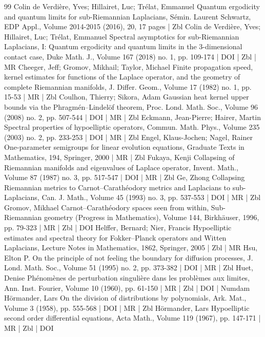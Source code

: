 \documentclass[10pt]{amsart}
\theoremstyle{definition}\newtheorem{defi}[theo]{Definition}\newtheorem{rema}[theo]{Remark}\newtheorem{exam}[theo]{Example}\newtheorem{exem}[theo]{Example}\newtheorem{nota}[theo]{Notation}
\begin{document}
\begin{thebibliography}{99}
Colin de Verdière, Yves; Hillairet, Luc; Trélat, Emmanuel Quantum ergodicity and quantum limits for sub-Riemannian Laplacians, Sémin. Laurent Schwartz, EDP Appl., Volume 2014-2015 (2016), 20, 17 pages | Zbl
Colin de Verdière, Yves; Hillairet, Luc; Trélat, Emmanuel Spectral asymptotics for sub-Riemannian Laplacians, I: Quantum ergodicity and quantum limits in the 3-dimensional contact case, Duke Math. J., Volume 167 (2018) no. 1, pp. 109-174 | DOI | Zbl | MR
Cheeger, Jeff; Gromov, Mikhail; Taylor, Michael Finite propagation speed, kernel estimates for functions of the Laplace operator, and the geometry of complete Riemannian manifolds, J. Differ. Geom., Volume 17 (1982) no. 1, pp. 15-53 | MR | Zbl
Coulhon, Thierry; Sikora, Adam Gaussian heat kernel upper bounds via the Phragmén–Lindelöf theorem, Proc. Lond. Math. Soc., Volume 96 (2008) no. 2, pp. 507-544 | DOI | MR | Zbl
Eckmann, Jean-Pierre; Hairer, Martin Spectral properties of hypoelliptic operators, Commun. Math. Phys., Volume 235 (2003) no. 2, pp. 233-253 | DOI | MR | Zbl
Engel, Klaus-Jochen; Nagel, Rainer One-parameter semigroups for linear evolution equations, Graduate Texts in Mathematics, 194, Springer, 2000 | MR | Zbl
Fukaya, Kenji Collapsing of Riemannian manifolds and eigenvalues of Laplace operator, Invent. Math., Volume 87 (1987) no. 3, pp. 517-547 | DOI | MR | Zbl
Ge, Zhong Collapsing Riemannian metrics to Carnot–Carathéodory metrics and Laplacians to sub-Laplacians, Can. J. Math., Volume 45 (1993) no. 3, pp. 537-553 | DOI | MR | Zbl
Gromov, Mikhael Carnot–Carathéodory spaces seen from within, Sub-Riemannian geometry (Progress in Mathematics), Volume 144, Birkhäuser, 1996, pp. 79-323 | MR | Zbl | DOI
Helffer, Bernard; Nier, Francis Hypoelliptic estimates and spectral theory for Fokker–Planck operators and Witten Laplacians, Lecture Notes in Mathematics, 1862, Springer, 2005 | Zbl | MR
Hsu, Elton P. On the principle of not feeling the boundary for diffusion processes, J. Lond. Math. Soc., Volume 51 (1995) no. 2, pp. 373-382 | DOI | MR | Zbl
Huet, Denise Phénomènes de perturbation singulière dans les problèmes aux limites, Ann. Inst. Fourier, Volume 10 (1960), pp. 61-150 | MR | Zbl | DOI | Numdam
Hörmander, Lars On the division of distributions by polynomials, Ark. Mat., Volume 3 (1958), pp. 555-568 | DOI | MR | Zbl
Hörmander, Lars Hypoelliptic second order differential equations, Acta Math., Volume 119 (1967), pp. 147-171 | MR | Zbl | DOI

\end{thebibliography}
\end{document}
